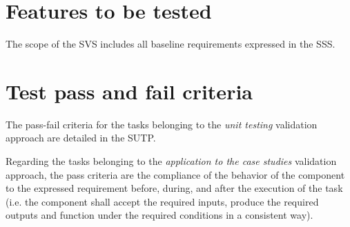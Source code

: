\section{Features to be tested}
The scope of the SVS includes all baseline requirements expressed in the SSS.


\section{Test pass and fail criteria}
The pass-fail criteria for the tasks belonging to the \emph{unit testing} validation approach are detailed in the SUTP.

Regarding the tasks belonging to the \emph{application to the case studies} validation approach, the pass criteria are the compliance of the behavior of the component to the expressed requirement before, during, and after the execution of the task (i.e. the component shall accept the required inputs, produce the required outputs and function under the required conditions in a consistent way).


%
%
%
%
%

\clearpage
